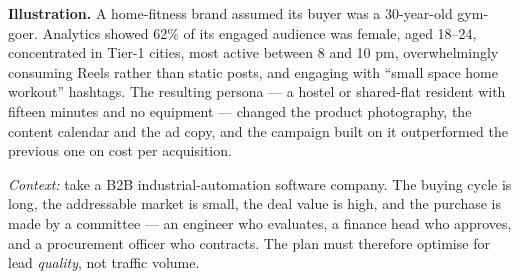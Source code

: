 \begin{qlist}
\textbf{Illustration.} A home-fitness brand assumed its buyer was a 30-year-old
gym-goer. Analytics showed 62\% of its engaged audience was female, aged
18--24, concentrated in Tier-1 cities, most active between 8 and 10 pm,
overwhelmingly consuming Reels rather than static posts, and engaging with
``small space home workout'' hashtags. The resulting persona --- a hostel or
shared-flat resident with fifteen minutes and no equipment --- changed the
product photography, the content calendar and the ad copy, and the campaign
built on it outperformed the previous one on cost per acquisition.

\textit{Context:} take a B2B industrial-automation software company. The
buying cycle is long, the addressable market is small, the deal value is high,
and the purchase is made by a committee --- an engineer who evaluates, a
finance head who approves, and a procurement officer who contracts. The plan
must therefore optimise for lead \emph{quality}, not traffic volume.


\end{qlist}
